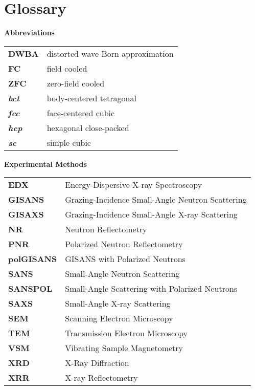\documentclass[\main/dresen_thesis.tex]{subfiles}
\begin{document}
  \section*{Glossary}

	\noindent \textbf{Abbreviations}
	\begin{table}[H]
      \begin{tabular}{p{3cm}l}
        \textbf{DWBA}           & distorted wave Born approximation \\
        \textbf{FC}             & field cooled \\
        \textbf{ZFC}            & zero-field cooled \\
        \textbf{\textit{bct}}   & body-centered tetragonal \\
        \textbf{\textit{fcc}}   & face-centered cubic \\
        \textbf{\textit{hcp}}   & hexagonal close-packed \\
        \textbf{\textit{sc}}    & simple cubic \\
			\end{tabular}
  \end{table}

	\noindent \textbf{Experimental Methods}
	\begin{table}[H]
    \begin{tabular}{p{3cm}l}
      \textbf{EDX}         & Energy-Dispersive X-ray Spectroscopy \\
      \textbf{GISANS}      & Grazing-Incidence Small-Angle Neutron Scattering \\
      \textbf{GISAXS}      & Grazing-Incidence Small-Angle X-ray Scattering \\
      \textbf{NR}          & Neutron Reflectometry \\
      \textbf{PNR}         & Polarized Neutron Reflectometry \\
      \textbf{polGISANS}   & GISANS with Polarized Neutrons \\
      \textbf{SANS}        & Small-Angle Neutron Scattering \\
      \textbf{SANSPOL}     & Small-Angle Scattering with Polarized Neutrons \\
      \textbf{SAXS}        & Small-Angle X-ray Scattering \\
      \textbf{SEM}         & Scanning Electron Microscopy \\
      \textbf{TEM}         & Transmission Electron Microscopy \\
      \textbf{VSM}         & Vibrating Sample Magnetometry \\
      \textbf{XRD}         & X-Ray Diffraction \\
      \textbf{XRR}         & X-ray Reflectometry \\
    \end{tabular}
  \end{table}
\end{document}
